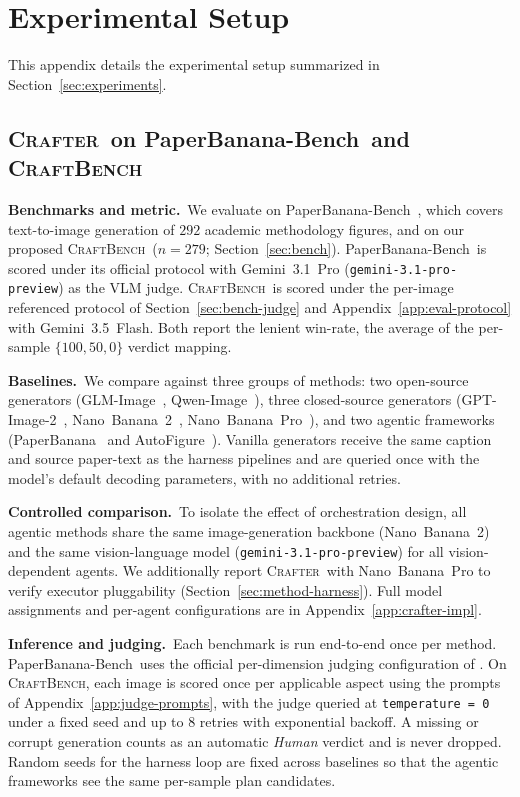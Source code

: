 \documentclass{llmxive}
\providecommand{\Crafter}{\textsc{Crafter}\xspace}
\providecommand{\CrafterBench}{\textsc{CraftBench}\xspace}
\providecommand{\PaperBananaBench}{PaperBanana-Bench\xspace}
\begin{document}
\section{Experimental Setup}
\label{app:experiment_setup}

This appendix details the experimental setup summarized in Section~\ref{sec:experiments}.

\subsection{\Crafter\ on \PaperBananaBench\ and \CrafterBench}
\label{app:setup-crafter}

\noindent\textbf{Benchmarks and metric.}\
We evaluate on \PaperBananaBench~\citep{zhu2026paperbanana}, which covers text-to-image generation of $292$ academic methodology figures, and on our proposed \CrafterBench\ ($n{=}279$; Section~\ref{sec:bench}). \PaperBananaBench\ is scored under its official protocol with Gemini~3.1~Pro (\texttt{gemini-3.1-pro-preview}) as the VLM judge. \CrafterBench\ is scored under the per-image referenced protocol of Section~\ref{sec:bench-judge} and Appendix~\ref{app:eval-protocol} with Gemini~3.5~Flash. Both report the lenient win-rate, the average of the per-sample $\{100, 50, 0\}$ verdict mapping.

\noindent\textbf{Baselines.}\
We compare against three groups of methods: two open-source generators (GLM-Image~\citep{glm2025image}, Qwen-Image~\citep{qwen2025image}), three closed-source generators (GPT-Image-2~\citep{openai2025gptimage2}, Nano~Banana~2~\citep{google2025nanobanana2}, Nano~Banana~Pro~\citep{google2025nanobananapro}), and two agentic frameworks (PaperBanana~\citep{zhu2026paperbanana} and AutoFigure~\citep{zhu2026autofigure}). Vanilla generators receive the same caption and source paper-text as the harness pipelines and are queried once with the model's default decoding parameters, with no additional retries.

\noindent\textbf{Controlled comparison.}\
To isolate the effect of orchestration design, all agentic methods share the same image-generation backbone (Nano~Banana~2) and the same vision-language model (\texttt{gemini-3.1-pro-preview}) for all vision-dependent agents. We additionally report \Crafter\ with Nano~Banana~Pro to verify executor pluggability (Section~\ref{sec:method-harness}). Full model assignments and per-agent configurations are in Appendix~\ref{app:crafter-impl}.

\noindent\textbf{Inference and judging.}\
Each benchmark is run end-to-end once per method.
\PaperBananaBench\ uses the official per-dimension judging
configuration of \citet{zhu2026paperbanana}. On \CrafterBench, each
image is scored once per applicable aspect using the prompts of
Appendix~\ref{app:judge-prompts}, with the judge queried at
\texttt{temperature\,=\,0} under a fixed seed and up to $8$ retries
with exponential backoff. A missing or corrupt generation counts as
an automatic \textit{Human} verdict and is never dropped.
Random seeds for the harness loop are fixed across baselines so
that the agentic frameworks see the same per-sample plan
candidates.
\end{document}
